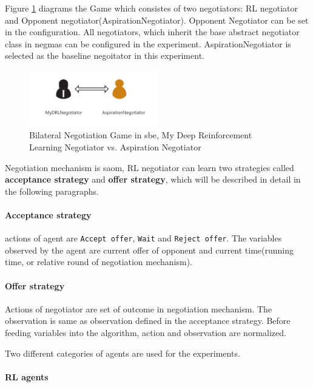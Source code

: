 Figure \ref{fig:bilateral-negotiation} diagrams the Game which consistes of two negotiators: RL negotiator and Opponent negotiator(AspirationNegotiator). Opponent Negotiator can be set in the configuration. All negotiators, which inherit the base abstract negotiator class in \gls{negmas} can be configured in the experiment. AspirationNegotiator is selected as the baseline negoitator in this experiment.

\begin{figure}[htbp]
\centering
\includegraphics[width=0.50\textwidth]{./images/bilateral-negotiation.png}
\caption{Bilateral Negotiation Game in \gls{sbe}, My Deep Reinforcement Learning Negotiator vs. Aspiration Negotiator}
\label{fig:bilateral-negotiation}
\end{figure}

Negotiation mechanism is \gls{saom}, RL negotiator can learn two strategies called \textbf{acceptance strategy} and \textbf{offer strategy}, which will be described in detail in the following paragraphs. 

\paragraph{Acceptance strategy} actions of agent are \texttt{Accept offer}, \texttt{Wait} and \texttt{Reject offer}. The variables observed by the agent are current offer of opponent and current time(running time, or relative round of negotiation mechanism).

\paragraph{Offer strategy} Actions of negotiator are set of outcome in negotiation mechanism. The observation is same as observation defined in the acceptance strategy. Before feeding variables into the algorithm, action and observation are normalized.

Two different categories of agents are used for the experiments.

\paragraph{RL agents}

